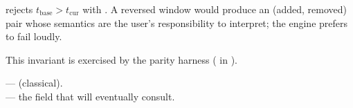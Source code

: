 \begin{invariant}
 rejects $t_{\text{base}} > t_{\text{cur}}$ with
. A reversed window would produce
an (added, removed) pair whose semantics are the user's responsibility
to interpret; the engine prefers to fail loudly.
\end{invariant}

This invariant is exercised by the parity harness
( in
).

\begin{inthecode}
 ---
 (classical).\\
 --- the
 field that 
will eventually consult.
\end{inthecode}
